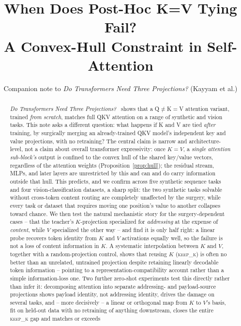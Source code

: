 \documentclass[11pt]{article}
\title{When Does Post-Hoc K=V Tying Fail?\\
A Convex-Hull Constraint in Self-Attention}
\author{Companion note to \emph{Do Transformers Need Three Projections?} (Kayyam et al.)}
\date{}
\begin{document}
\maketitle

\begin{abstract}
\emph{Do Transformers Need Three Projections?}~\cite{kayyam2025} shows that a Q$\neq$K$=$V attention
variant, trained \emph{from scratch}, matches full QKV attention on a range of
synthetic and vision tasks. This note asks a different question: what happens if K
and V are tied \emph{after} training, by surgically merging an already-trained QKV
model's independent key and value projections, with no retraining? The central claim
is narrow and architecture-level, not a claim about overall transformer expressivity:
once $K=V$, a \emph{single attention sub-block's} output is confined to the convex
hull of the shared key/value vectors, regardless of the attention weights
(Proposition~\ref{prop:hull}); the residual stream, MLPs, and later layers are
unrestricted by this and can and do carry information outside that hull. This
predicts, and we confirm across five synthetic sequence tasks and four
vision-classification datasets, a sharp split: the two synthetic tasks solvable
without cross-token content routing are completely unaffected by the surgery, while
every task or dataset that requires moving one position's value to another collapses
toward chance. We then test the natural mechanistic story for the surgery-dependent
cases -- that the teacher's $K$-projection specialized for \emph{addressing} at the
expense of \emph{content}, while $V$ specialized the other way -- and find it is only
half right: a linear probe recovers token identity from $K$ and $V$ activations
equally well, so the failure is not a loss of content information in $K$. A
systematic interpolation between $K$ and $V$, together with a random-projection
control, shows that reusing $K$ (\textsc{keep\_k}) is often no better than an
unrelated, untrained projection despite retaining linearly decodable token
information -- pointing to a representation-compatibility account rather than a
simple information-loss one. Two further zero-shot experiments test this directly
rather than infer it: decomposing attention into separate addressing- and
payload-source projections shows payload identity, not addressing identity, drives
the damage on several tasks, and -- more decisively -- a linear or orthogonal map
from $K$ to $V$'s basis, fit on held-out data with no retraining of anything
downstream, closes the entire \textsc{keep\_k} gap and matches or exceeds

\end{abstract}
\end{document}
